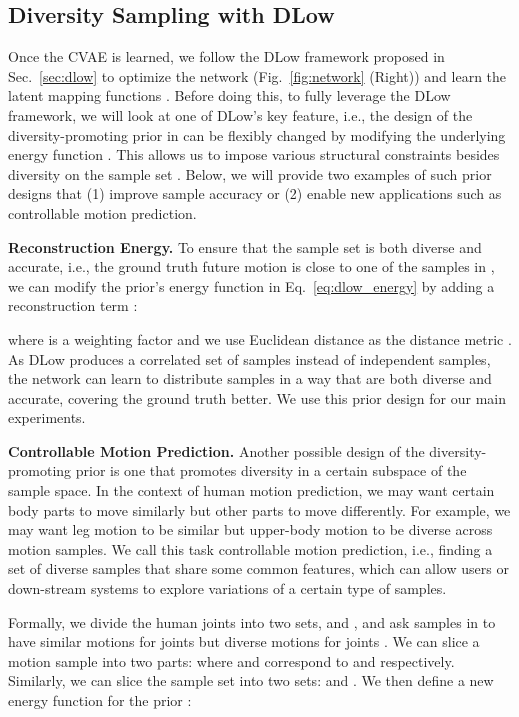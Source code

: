 \documentclass[runningheads]{llncs}
\begin{document}
	\subsection{Diversity Sampling with DLow}
	Once the CVAE is learned, we follow the DLow framework proposed in Sec.~\ref{sec:dlow} to optimize the network  (Fig.~\ref{fig:network} (Right)) and learn the latent mapping functions . Before doing this, to fully leverage the DLow framework, we will look at one of DLow's key feature, i.e., the design of the diversity-promoting prior  in  can be flexibly changed by modifying the underlying energy function . This allows us to impose various structural constraints besides diversity on the sample set . Below, we will provide two examples of such prior designs that (1) improve sample accuracy or (2) enable new applications such as controllable motion prediction.
	
	\vspace{1mm}
	\noindent\textbf{Reconstruction Energy.}
	To ensure that the sample set  is both diverse and accurate, i.e., the ground truth future motion  is close to one of the samples in , we can modify the prior's energy function  in Eq.~\eqref{eq:dlow_energy} by adding a reconstruction term :
	
	where  is a weighting factor and we use Euclidean distance as the distance metric . As DLow produces a correlated set of samples  instead of independent samples, the network  can learn to distribute samples in a way that are both diverse and accurate, covering the ground truth better. We use this prior design for our main experiments.
	
	\vspace{1mm}
	\noindent\textbf{Controllable Motion Prediction.} 
	Another possible design of the diversity-promoting prior  is one that promotes diversity in a certain subspace of the sample space. In the context of human motion prediction, we may want certain body parts to move similarly but other parts to move differently. For example, we may want leg motion to be similar but upper-body motion to be diverse across motion samples.
	We call this task controllable motion prediction, i.e., finding a set of diverse samples that share some common features, which can allow users or down-stream systems to explore variations of a certain type of samples.
	
	Formally, we divide the human joints into two sets,  and , and ask samples in  to have similar motions for joints  but diverse motions for joints . 
	We can slice a motion sample  into two parts:  where  and  correspond to  and  respectively. Similarly, we can slice the sample set  into two sets:  and . We then define a new energy function  for the prior :
	
\end{document}
